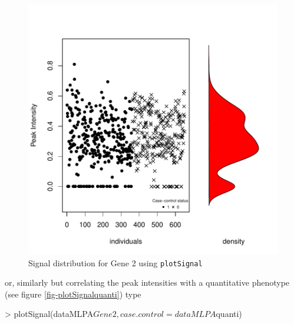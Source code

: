 \documentclass[11pt]{article}
\begin{document}
\begin{figure}[ht]
\begin{center}
\includegraphics{CNVassoc_vignette-007}
\caption{\small Signal distribution for Gene 2 using \texttt{plotSignal}}
\label{fig-plotSignalcasecon}
\end{center}
\end{figure}

\noindent or, similarly but correlating the peak intensities with a quantitative phenotype (see figure \ref{fig-plotSignalquanti}) type
\begin{Schunk}
\begin{Sinput}
> plotSignal(dataMLPA$Gene2, case.control = dataMLPA$quanti)
\end{Sinput}
\end{Schunk}
\end{document}
